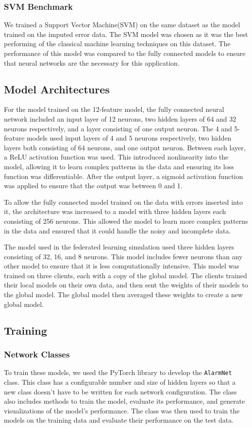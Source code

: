 \documentclass[conference]{IEEEtran}
\begin{document}
\subsubsection{SVM Benchmark}
We trained a Support Vector Machine(SVM) on the same dataset as the model trained on the imputed error data. The SVM model was chosen as it was the best performing of the classical machine learning techniques on this dataset. The performance of this model was compared to the fully connected models to ensure that neural networks are the necessary for this application.

\subsection{Model Architectures}
For the model trained on the 12-feature model, the fully
connected neural network included an input layer of 12
neurons, two hidden layers of 64 and 32 neurons
respectively, and a layer consisting of one output neuron.
The 4 and 5-feature models used input layers of 4 and 5
neurons respectively, two hidden layers both consisting of
64 neurons, and one output neuron. Between each layer, a
ReLU activation function was used. This introduced
nonlinearity into the model, allowing it to learn complex
patterns in the data and ensuring its loss function was
differentiable. After the output layer, a sigmoid activation
function was applied to ensure that the output was between 0
and 1.

To allow the fully connected model trained on the data with
errors inserted into it, the architecture was increased to a
model with three hidden layers each consisting of 256
neurons. This allowed the model to learn more complex
patterns in the data and ensured that it could handle the
noisy and incomplete data.

The model used in the federated learning simulation used
three hidden layers consisting of 32, 16, and 8 neurons.
This model includes fewer neurons than any other model to
ensure that it is less computationally intensive. This model
was trained on three clients, each with a copy of the global
model. The clients trained their local models on their own
data, and then sent the weights of their models to the
global model. The global model then averaged these weights
to create a new global model.

\subsection{Training}
\subsubsection{Network Classes}
To train these models, we used the PyTorch library to develop the \texttt{AlarmNet} class. This class has a configurable number and size of hidden layers so that a new class doesn't have to be written for each network configuration. The class also includes methods to train the model, evaluate its performance, and generate visualizations of the model's performance. The class was then used to train the models on the training data and evaluate their performance on the test data.
\end{document}
